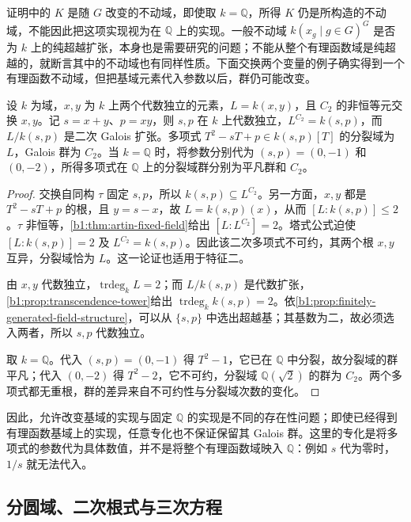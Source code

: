 证明中的 \(K\) 是随 \(G\) 改变的不动域，即使取 \(k=\mathbb Q\)，所得 \(K\) 仍是所构造的不动域，不能因此把这项实现视为在 \(\mathbb Q\) 上的实现。一般不动域 \(k(x_g\mid g\in G)^G\) 是否为 \(k\) 上的纯超越扩张，本身也是需要研究的问题；不能从整个有理函数域是纯超越的，就断言其中的不动域也有同样性质。下面交换两个变量的例子确实得到一个有理函数不动域，但把基域元素代入参数以后，群仍可能改变。

\begin{proposition}\label{b1:prop:D-specialization-changes-group}
	设 \(k\) 为域，\(x,y\) 为 \(k\) 上两个代数独立的元素，\(L=k(x,y)\)，且 \(C_2\) 的非恒等元交换 \(x,y\)。记 \(s=x+y\)、\(p=xy\)，则 \(s,p\) 在 \(k\) 上代数独立，\(L^{C_2}=k(s,p)\)，而 \(L/k(s,p)\) 是二次 Galois 扩张。多项式 \(T^2-sT+p\in k(s,p)[T]\) 的分裂域为 \(L\)，Galois 群为 \(C_2\)。当 \(k=\mathbb Q\) 时，将参数分别代为 \((s,p)=(0,-1)\) 和 \((0,-2)\)，所得多项式在 \(\mathbb Q\) 上的分裂域群分别为平凡群和 \(C_2\)。
\end{proposition}
\begin{proof}
	交换自同构 \(\tau\) 固定 \(s,p\)，所以 \(k(s,p)\subseteq L^{C_2}\)。另一方面，\(x,y\) 都是 \(T^2-sT+p\) 的根，且 \(y=s-x\)，故 \(L=k(s,p)(x)\)，从而 \([L:k(s,p)]\leq2\)。\(\tau\) 非恒等，\cref{b1:thm:artin-fixed-field}给出 \([L:L^{C_2}]=2\)。塔式公式迫使 \([L:k(s,p)]=2\) 及 \(L^{C_2}=k(s,p)\)。因此该二次多项式不可约，其两个根 \(x,y\) 互异，分裂域恰为 \(L\)。这一论证也适用于特征二。

	由 \(x,y\) 代数独立，\(\operatorname{trdeg}_k L=2\)；而 \(L/k(s,p)\) 是代数扩张，\cref{b1:prop:transcendence-tower}给出 \(\operatorname{trdeg}_k k(s,p)=2\)。依\cref{b1:prop:finitely-generated-field-structure}，可以从 \(\{s,p\}\) 中选出超越基；其基数为二，故必须选入两者，所以 \(s,p\) 代数独立。

	取 \(k=\mathbb Q\)。代入 \((s,p)=(0,-1)\) 得 \(T^2-1\)，它已在 \(\mathbb Q\) 中分裂，故分裂域的群平凡；代入 \((0,-2)\) 得 \(T^2-2\)，它不可约，分裂域 \(\mathbb Q(\sqrt2)\) 的群为 \(C_2\)。两个多项式都无重根，群的差异来自不可约性与分裂域次数的变化。
\end{proof}

因此，允许改变基域的实现与固定 \(\mathbb Q\) 的实现是不同的存在性问题；即使已经得到有理函数基域上的实现，任意专化也不保证保留其 Galois 群。这里的专化是将多项式的参数代为具体数值，并不是将整个有理函数域映入 \(\mathbb Q\)：例如 \(s\) 代为零时，\(1/s\) 就无法代入。

\subsection{分圆域、二次根式与三次方程}
\label{b1:subsec:D02:02}

